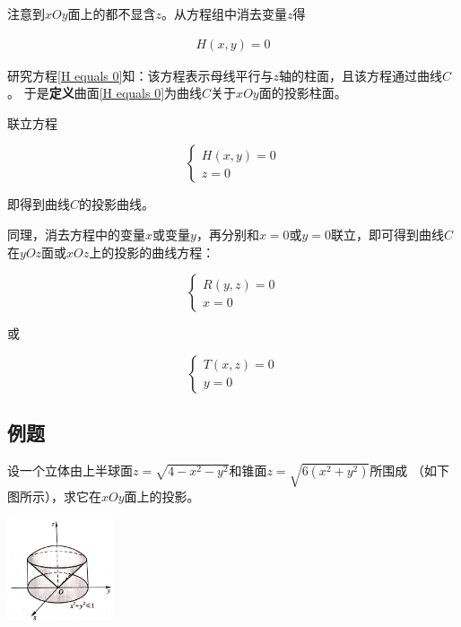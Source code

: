 \documentclass[12pt, a4paper]{article}
\numberwithin{equation}{section}
\begin{document}
    注意到\(xOy\)面上的都不显含\(z\)。从方程组中消去变量\(z\)得

    \begin{align}
        H\left(x,y\right) = 0
        \label{H equals 0}
    \end{align}

    研究方程\ref{H equals 0}知：该方程表示母线平行与\(z\)轴的柱面，且该方程通过曲线\(C\)。
    于是\textbf{定义}曲面\ref{H equals 0}为曲线\(C\)关于\(xOy\)面的投影柱面。

    联立方程

    \begin{equation}
        \left\{\begin{array}{l}
        H\left(x,y\right) = 0 \\
        z=0
        \end{array}\right.
    \end{equation}

    即得到曲线\(C\)的投影曲线。

    同理，消去方程中的变量\(x\)或变量\(y\)，再分别和\(x=0\)或\(y=0\)联立，即可得到曲线\(C\)
    在\(yOz\)面或\(xOz\)上的投影的曲线方程：

    \begin{equation}
        \left\{\begin{array}{l}
        R\left(y,z\right) = 0 \\
        x=0
        \end{array}\right.
    \end{equation}

    或

    \begin{equation}
        \left\{\begin{array}{l}
        T\left(x,z\right) = 0 \\
        y=0
        \end{array}\right.
    \end{equation}

\subsection{例题}

    设一个立体由上半球面\(z = \sqrt{4-x^2-y^2}\)和锥面\(z = \sqrt{6\left(x^2+y^2\right)}\)所围成
    （如下图所示），求它在\(xOy\)面上的投影。

    \begin{center}
        \includegraphics[height=3cm]{"Chapter 08 images/pic18.jpg"}
    \end{center}
\end{document}
